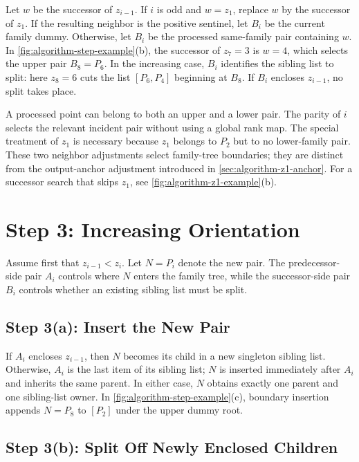 Let $w$ be the successor of $z_{i-1}$. If $i$ is odd and $w=z_1$, replace
$w$ by the successor of $z_1$. If the resulting neighbor is the positive
sentinel, let $B_i$ be the current family dummy. Otherwise, let $B_i$ be the
processed same-family pair containing $w$.
In \cref{fig:algorithm-step-example}(b), the successor of $z_7=3$ is
$w=4$, which selects the upper pair $B_8=P_6$. In the increasing case,
$B_i$ identifies the sibling list to split: here $z_8=6$ cuts the list
$[P_6,P_4]$ beginning at $B_8$. If $B_i$ encloses $z_{i-1}$, no split
takes place.

A processed point can belong to both an upper and a lower pair. The parity of
$i$ selects the relevant incident pair without using a global rank map. The
special treatment of $z_1$ is necessary because $z_1$ belongs to $P_2$ but to
no lower-family pair. These two neighbor adjustments select family-tree
boundaries; they are distinct from the output-anchor adjustment introduced in
\cref{sec:algorithm-z1-anchor}. For a successor search that skips $z_1$, see
\cref{fig:algorithm-z1-example}(b).

\section{Step 3: Increasing Orientation}
\label{sec:algorithm-step3-increasing}

Assume first that $z_{i-1}<z_i$. Let $N=P_i$ denote the new pair. The
predecessor-side pair $A_i$ controls where $N$ enters the family tree, while
the successor-side pair $B_i$ controls whether an existing sibling list must
be split.

\subsection{Step 3(a): Insert the New Pair}
\label{sec:algorithm-step3a-increasing}

If $A_i$ encloses $z_{i-1}$, then $N$ becomes its child in a new singleton
sibling list. Otherwise, $A_i$ is the last item of its sibling list; $N$ is
inserted immediately after $A_i$ and inherits the same parent. In either case,
$N$ obtains exactly one parent and one sibling-list owner.
In \cref{fig:algorithm-step-example}(c), boundary insertion appends
$N=P_8$ to $[P_2]$ under the upper dummy root.

\subsection{Step 3(b): Split Off Newly Enclosed Children}
\label{sec:algorithm-step3b-increasing}

